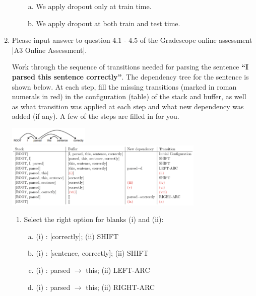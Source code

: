 \begin{enumerate}[1.]
\begin{enumerate}[3a.]
\begin{enumerate}[(a)]
\item We apply dropout only at train time.
\item We apply dropout at both train and test time.
\end{enumerate}


\end{enumerate}

\item Please input answer to question 4.1 - 4.5 of the Gradescope online assessment |A3 Online Assessment|.

Work through the sequence of transitions needed for parsing the sentence {\bf ``I parsed this sentence correctly''}. The dependency tree for the sentence is shown below. At each step, fill the missing transitions (marked in roman numerals in red) in the configuration (table) of the stack and buffer, as well as what transition was applied at each step and what new dependency was added (if any). A few of the steps are filled in for you.

\begin{center}
\includegraphics[width=0.3\textwidth]{4-1.png}
\includegraphics[width=0.75\textwidth]{4-2.png}
\end{center}

\begin{enumerate}[4a.]

\item {} Select the right option for blanks (i) and (ii):

\begin{enumerate}[(a)]
\item (i) : [correctly]; (ii) SHIFT
\item (i) : [sentence, correctly]; (ii) SHIFT
\item (i) : parsed $\rightarrow$ this; (ii) LEFT-ARC
\item (i) : parsed $\rightarrow$ this; (ii) RIGHT-ARC
\end{enumerate}


\end{enumerate}
\end{enumerate}
